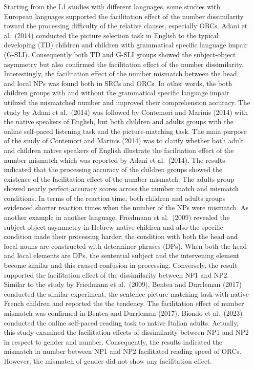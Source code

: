 \documentclass[
]{article}
\begin{document}
Starting from the L1 studies with different languages, some studies with
European languages supported the facilitation effect of the number
dissimilarity toward the processing difficulty of the relative clauses,
especially ORCs. Adani et al.~(2014) conducted the picture selection
task in English to the typical developing (TD) children and children
with grammatical specific language impair (G-SLI). Consequently both TD
and G-SLI groups showed the subject-object asymmetry but also confirmed
the facilitation effect of the number dissimilarity. Interestingly, the
facilitation effect of the number mismatch between the head and local
NPs was found both in SRCs and ORCs. In other words, the both children
groups with and without the grammatical specific language impair
utilized the mismatched number and improved their comprehension
accuracy. The study by Adani et al.~(2014) was followed by Contemori and
Marinis (2014) with the native speakers of English, but both children
and adults groups with the online self-paced listening task and the
picture-matching task. The main purpose of the study of Contemori and
Marinis (2014) was to clarify whether both adult and children native
speakers of English illustrate the facilitation effect of the number
mismatch which was reported by Adani et al.~(2014). The results
indicated that the processing accuracy of the children groups showed the
existence of the facilitation effect of the number mismatch. The adults
group showed nearly perfect accuracy scores across the number match and
mismatch conditions. In terms of the reaction time, both children and
adults groups evidenced shorter reaction times when the number of the
NPs were mismatch. As another example in another language, Friedmann et
al.~(2009) revealed the subject-object asymmetry in Hebrew native
children and also the specific condition made their processing harder;
the condition with both the head and local nouns are constructed with
determiner phrases (DPs). When both the head and local elements are DPs,
the sentential subject and the intervening element become similar and
this caused confusion in processing. Conversely, the result supported
the facilitation effect of the dissimilarity between NP1 and NP2.
Similar to the study by Friedmann et al.~(2009), Bentea and Durrleman
(2017) conducted the similar experiment, the sentence-picture matching
task with native French children and reported the the tendency. The
facilitation effect of number mismatch was confirmed in Bentea and
Durrleman (2017). Biondo et al.~(2023) conducted the online self-paced
reading task to native Italian adults. Actually, this study examined the
facilitation effects of dissimilarity between NP1 and NP2 in respect to
gender and number. Consequently, the results indicated the mismatch in
number between NP1 and NP2 facilitated reading speed of ORCs. However,
the mismatch of gender did not show any facilitation effect.
\end{document}
